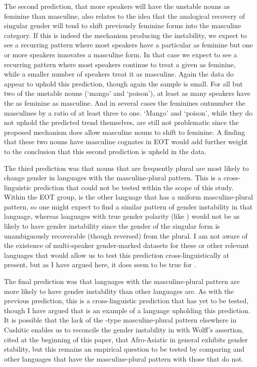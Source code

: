 \documentclass[output=paper,modfonts]{langscibook}
\begin{document}
The second prediction, that more speakers will have the unstable nouns as feminine than masculine, also relates to the idea that the analogical recovery of singular gender will tend to shift previously feminine forms into the masculine category. If this is indeed the mechanism producing the instability, we expect to see a recurring pattern where most speakers have a particular  as feminine but one or more speakers innovates a masculine form. In that case we expect to see a recurring pattern where most speakers continue to treat a given  as feminine, while a smaller number of speakers treat it as masculine. Again the data do appear to uphold this prediction, though again the sample is small. For all but two of the unstable nouns (‘mango’ and ‘poison’), at least as many speakers have the  as feminine as masculine. And in several cases the feminines outnumber the masculines by a ratio of at least three to one. ‘Mango’ and ‘poison’, while they do not uphold the predicted trend themselves, are still not problematic since the proposed mechanism does allow masculine nouns to shift to feminine. A finding that these two nouns have masculine cognates in EOT would add further weight to the conclusion that this second prediction is upheld in the data.

The third prediction was that nouns that are frequently plural are most likely to change gender in languages with the masculine-plural pattern. This is a cross-linguistic prediction that could not be tested within the scope of this study. Within the EOT group,  is the other language that has a uniform masculine-plural pattern, so one might expect to find a similar pattern of  gender instability in that language, whereas languages with true gender polarity (like ) would not be as likely to have gender instability since the gender of the singular form is unambiguously recoverable (though reversed) from the plural. I am not aware of the existence of multi-speaker gender-marked  datasets for these or other relevant languages that would allow us to test this prediction cross-linguistically at present, but as I have argued here, it does seem to be true for .

The final prediction was that languages with the masculine-plural pattern are more likely to have gender instability than other languages are. As with the previous prediction, this is a cross-linguistic prediction that has yet to be tested, though I have argued that  is an example of a language upholding this prediction. It is possible that the lack of the -type masculine-plural pattern elsewhere in Cushitic enables us to reconcile the gender instability in  with Wolff’s assertion, cited at the beginning of this paper, that Afro-Asiatic in general exhibits gender stability, but this remains an empirical question to be tested by comparing  and other languages that have the masculine-plural pattern with those that do not.
\end{document}
